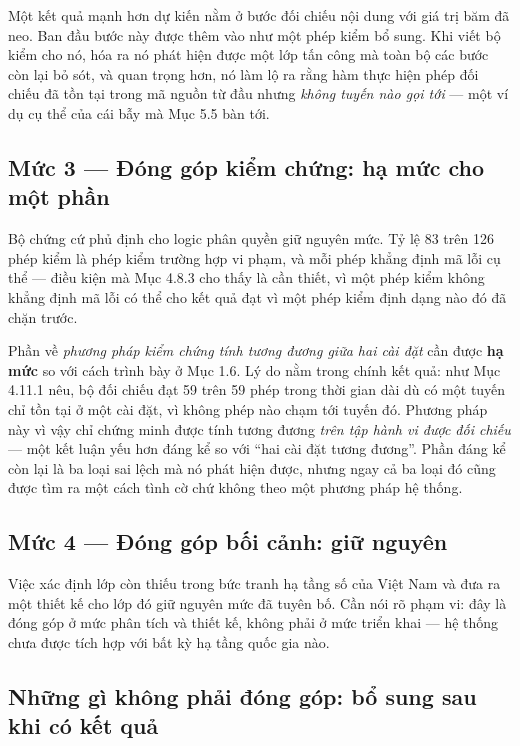 Một kết quả mạnh hơn dự kiến nằm ở bước đối chiếu nội dung với giá trị băm đã neo. Ban đầu bước này được thêm vào như một phép kiểm bổ sung. Khi viết bộ kiểm cho nó, hóa ra nó phát hiện được một lớp tấn công mà toàn bộ các bước còn lại bỏ sót, và quan trọng hơn, nó làm lộ ra rằng hàm thực hiện phép đối chiếu đã tồn tại trong mã nguồn từ đầu nhưng \emph{không tuyến nào gọi tới} --- một ví dụ cụ thể của cái bẫy mà Mục 5.5 bàn tới.

\subsection{Mức 3 --- Đóng góp kiểm chứng: hạ mức cho một phần}

Bộ chứng cứ phủ định cho logic phân quyền giữ nguyên mức. Tỷ lệ 83 trên 126 phép kiểm là phép kiểm trường hợp vi phạm, và mỗi phép khẳng định mã lỗi cụ thể --- điều kiện mà Mục 4.8.3 cho thấy là cần thiết, vì một phép kiểm không khẳng định mã lỗi có thể cho kết quả đạt vì một phép kiểm định dạng nào đó đã chặn trước.

Phần về \emph{phương pháp kiểm chứng tính tương đương giữa hai cài đặt} cần được \textbf{hạ mức} so với cách trình bày ở Mục 1.6. Lý do nằm trong chính kết quả: như Mục 4.11.1 nêu, bộ đối chiếu đạt 59 trên 59 phép trong thời gian dài dù có một tuyến chỉ tồn tại ở một cài đặt, vì không phép nào chạm tới tuyến đó. Phương pháp này vì vậy chỉ chứng minh được tính tương đương \emph{trên tập hành vi được đối chiếu} --- một kết luận yếu hơn đáng kể so với {``}hai cài đặt tương đương{''}. Phần đáng kể còn lại là ba loại sai lệch mà nó phát hiện được, nhưng ngay cả ba loại đó cũng được tìm ra một cách tình cờ chứ không theo một phương pháp hệ thống.

\subsection{Mức 4 --- Đóng góp bối cảnh: giữ nguyên}

Việc xác định lớp còn thiếu trong bức tranh hạ tầng số của Việt Nam và đưa ra một thiết kế cho lớp đó giữ nguyên mức đã tuyên bố. Cần nói rõ phạm vi: đây là đóng góp ở mức phân tích và thiết kế, không phải ở mức triển khai --- hệ thống chưa được tích hợp với bất kỳ hạ tầng quốc gia nào.

\subsection{Những gì không phải đóng góp: bổ sung sau khi có kết quả}

